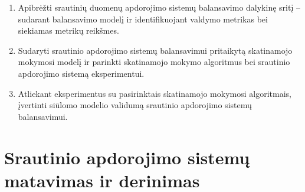 \documentclass{VUMIFPSbakalaurinis}
\begin{document}
\begin{enumerate}
    \item Apibrėžti srautinių duomenų apdorojimo sistemų balansavimo dalykinę sritį – sudarant balansavimo modelį ir identifikuojant valdymo metrikas bei siekiamas metrikų reikšmes.
    \item Sudaryti srautinio apdorojimo sistemų balansavimui pritaikytą skatinamojo mokymosi modelį ir parinkti skatinamojo mokymo algoritmus bei srautinio apdorojimo sistemą eksperimentui.
    \item Atliekant eksperimentus su pasirinktais skatinamojo mokymosi algoritmais, įvertinti siūlomo modelio validumą srautinio apdorojimo sistemų balansavimui.
\end{enumerate}

\section{Srautinio apdorojimo sistemų matavimas ir derinimas}
\end{document}
